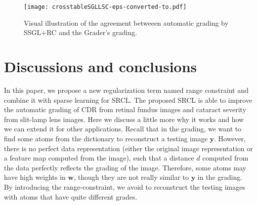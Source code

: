 \documentclass[journal]{IEEEtran}
\begin{document}
%	         

\begin{figure}
	\centering
	
	\texttt{[image: crosstableSGLLSC-eps-converted-to.pdf]}
	
	
	\caption{Visual illustration of the agreement betweeen automatic grading by SSGL+RC and the Grader's grading.} \label{fig67}
\end{figure}
\section{Discussions and conclusions} \label{discuss}
In this paper, we propose a new regularization term named range constraint and combine it with sparse learning for SRCL. The proposed SRCL is able to improve the automatic grading of CDR from retinal fundus images and cataract severity from slit-lamp lens images.  Here we discuss a little more why it works and how we can extend it for other applications. Recall that in the grading, we want to find some atoms from the dictionary to reconstruct a testing image $\textbf{y}$. However, there is no perfect data representation  (either the original image representation or a feature map computed from the image), such that a distance $d$ computed from the data perfectly reflects the grading of the image. Therefore,  some atoms may have high weights in $\textbf{w}$, though they are not really similar to $\textbf{y}$ in the grading. By introducing the range-constraint, we avoid to reconstruct the testing images with atoms that have quite different grades.
\end{document}
